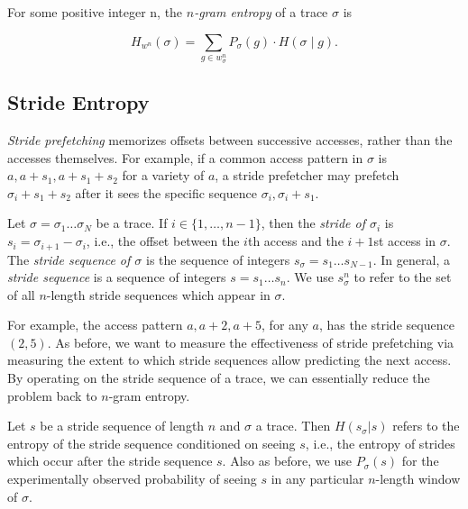 
\begin{definition} For some positive integer n, the
  \textit{$n$-gram entropy} of a trace $\sigma$ is

\begin{equation*}
  H_{w^n}(\sigma) = \sum_{g \in w^n_\sigma} P_\sigma(g) \cdot H(\sigma \mid g).
\end{equation*}

\end{definition}

\subsection{Stride Entropy}

\textit{Stride prefetching} memorizes offsets between successive accesses,
rather than the accesses themselves. For example, if a common access pattern in
$\sigma$ is $a, a+s_1, a+s_1+s_2$ for a variety of $a$, a stride prefetcher
may prefetch $\sigma_i+s_1+s_2$ after it sees the specific sequence $\sigma_i,
\sigma_i + s_1$.


\begin{definition} Let $\sigma =
  \sigma_1\dots\sigma_N$ be a trace. If $i\in \{1, \dots, n-1\}$, then the
  \textit{stride of $\sigma_i$} is $s_i = \sigma_{i+1} - \sigma_i$, i.e., the
  offset between the $i$th access and the $i+1$st access in $\sigma$. The
  \textit{stride sequence of $\sigma$} is the sequence of integers $s_\sigma =
  s_1\dots s_{N-1}$. In general, a \textit{stride sequence} is a sequence of
  integers $s = s_1\dots s_n$. We use $s_\sigma^n$ to refer to the set of all
  $n$-length stride sequences which appear in $\sigma$. \end{definition}

For example, the access pattern $a, a+2, a+5$, for any $a$, has the stride
sequence $(2, 5)$. As before, we want to measure the effectiveness of stride
prefetching via measuring the extent to which stride sequences allow predicting
the next access. By operating on the stride sequence of a trace, we can
essentially reduce the problem back to $n$-gram entropy.

Let $s$ be a stride sequence of length $n$ and $\sigma$ a trace. Then
$H(s_\sigma | s)$ refers to the entropy of the stride sequence conditioned on
seeing $s$, i.e., the entropy of strides which occur after the stride sequence
$s$. Also as before, we use $P_\sigma(s)$ for the experimentally observed
probability of seeing $s$ in any particular $n$-length window of $\sigma$.

